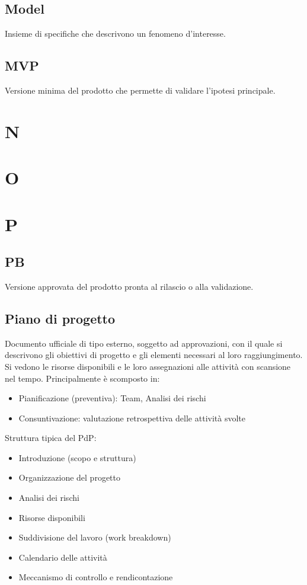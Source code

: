 \documentclass[a4paper,12pt]{article}
\begin{document}
\subsection{Model}
Insieme di specifiche che descrivono un fenomeno d’interesse.

\subsection{MVP}
Versione minima del prodotto che permette di validare l’ipotesi principale.

\section{N}

\section{O}

\section{P}

\subsection{PB}
Versione approvata del prodotto pronta al rilascio o alla validazione.

\subsection{Piano di progetto}
Documento ufficiale di tipo esterno, soggetto ad approvazioni, con il quale si descrivono gli obiettivi di progetto e gli elementi necessari al loro raggiungimento.  
Si vedono le risorse disponibili e le loro assegnazioni alle attività con scansione nel tempo.  
Principalmente è scomposto in:
\begin{itemize}
\item Pianificazione (preventiva): Team, Analisi dei rischi
\item Consuntivazione: valutazione retrospettiva delle attività svolte
\end{itemize}
Struttura tipica del PdP:
\begin{itemize}
\item Introduzione (scopo e struttura)
\item Organizzazione del progetto
\item Analisi dei rischi
\item Risorse disponibili
\item Suddivisione del lavoro (work breakdown)
\item Calendario delle attività
\item Meccanismo di controllo e rendicontazione
\end{itemize}
\end{document}
